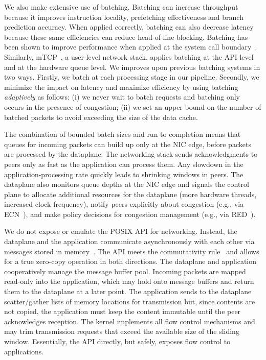 We also make extensive use of batching. Batching can increase throughput because it
improves instruction locality, prefetching effectiveness and branch prediction accuracy.
When applied correctly, batching can also
decrease latency because these same efficiencies can reduce head-of-line blocking.
Batching has been shown to improve performance when applied at the system call
boundary~\cite{DBLP:conf/osdi/HanMCR12, DBLP:conf/osdi/SoaresS10}. Similarly,
mTCP~\cite{jeong2014mtcp}, a user-level network stack, applies batching
at the API level and at the hardware queue level.
We improves upon previous batching systems in two ways.
Firstly, we batch at each processing stage in our pipeline. Secondly, we
minimize the impact on latency and maximize efficiency by using batching
\emph{adaptively} as follows: (i) we never wait to batch requests and batching
only occurs in the presence of congestion; (ii) we set an upper bound on
the number of batched packets to avoid exceeding the size of the data cache.

The combination of bounded batch sizes and run to completion means that
queues for incoming packets can build up only at the NIC edge, before
packets are processed by the dataplane.  The networking stack sends
acknowledgments to peers only as fast as the application can process
them. Any slowdown in the application-processing rate quickly leads to
shrinking windows in peers. The dataplane also monitors queue depths
at the NIC edge and signals the control plane to allocate additional
resources for the dataplane (more hardware threads, increased clock
frequency), notify peers explicitly about congestion (e.g., via
ECN~\cite{ramakrishnan2001addition}), and make policy decisions for
congestion management (e.g., via
RED~\cite{DBLP:journals/ton/FloydJ93}).



 We do
not expose or emulate the POSIX API for networking.  Instead, the
dataplane and the application communicate asynchronously with each
other via messages stored in
memory~\cite{DBLP:conf/osdi/HanMCR12,DBLP:journals/cacm/Rizzo12}.  The API meets the
commutativity rule~\cite{DBLP:conf/sosp/ClementsKZMK13} and allows for
a true zero-copy operation in both directions. The dataplane and
application cooperatively manage the message buffer pool. Incoming
packets are mapped read-only into the application, which may hold onto
message buffers and return them to the dataplane at a later point.
The application sends to the dataplane scatter/gather lists of memory
locations for transmission but, since contents are not copied, the
application must keep the content immutable until the peer
acknowledges reception. The kernel implements all flow control
mechanisms and may trim transmission requests that exceed the
available size of the sliding window.  Essentially, the API directly,
but safely, exposes flow control to applications.


